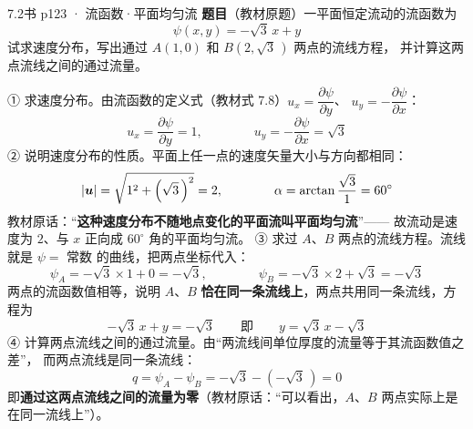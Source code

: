 \begin{liti}{7.2}{书 p123 · 流函数·平面均匀流}
\textbf{题目}（教材原题）一平面恒定流动的流函数为
\[ \psi(x,y)=-\sqrt{3}\,x+y \]
试求速度分布，写出通过 $A(1,0)$ 和 $B(2,\sqrt{3}\,)$ 两点的流线方程，
并计算这两点流线之间的通过流量。
\begin{jie}
① 求速度分布。由流函数的定义式（教材式 7.8）$u_x=\dfrac{\partial\psi}{\partial y}$、
$u_y=-\dfrac{\partial\psi}{\partial x}$：
\[ u_x=\frac{\partial\psi}{\partial y}=1,\qquad\qquad
   u_y=-\frac{\partial\psi}{\partial x}=\sqrt{3} \]
② 说明速度分布的性质。平面上任一点的速度矢量大小与方向都相同：
\[ |\bm{u}|=\sqrt{1^2+\left(\sqrt{3}\,\right)^2}=2,\qquad\qquad
   \alpha=\arctan\frac{\sqrt{3}}{1}=60^{\circ} \]
教材原话：“\textbf{这种速度分布不随地点变化的平面流叫平面均匀流}”——
故流动是速度为 $2$、与 $x$ 正向成 $60^{\circ}$ 角的平面均匀流。
③ 求过 $A$、$B$ 两点的流线方程。流线就是 $\psi=$ 常数 的曲线，把两点坐标代入：
\[ \psi_A=-\sqrt{3}\times 1+0=-\sqrt{3},\qquad\qquad
   \psi_B=-\sqrt{3}\times 2+\sqrt{3}=-\sqrt{3} \]
两点的流函数值相等，说明 $A$、$B$ \textbf{恰在同一条流线上}，两点共用同一条流线，方程为
\[ -\sqrt{3}\,x+y=-\sqrt{3}\qquad\text{即}\qquad y=\sqrt{3}\,x-\sqrt{3} \]
④ 计算两点流线之间的通过流量。由“两流线间单位厚度的流量等于其流函数值之差”，
而两点流线是同一条流线：
\[ q=\psi_A-\psi_B=-\sqrt{3}-\left(-\sqrt{3}\,\right)=0 \]
即\textbf{通过这两点流线之间的流量为零}（教材原话：“可以看出，$A$、$B$ 两点实际上是在同一流线上”）。
\end{jie}
\end{liti}

